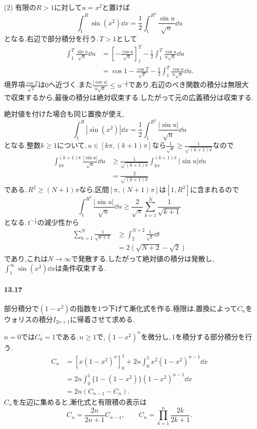 (2) 有限の$R>1$に対して$u=x^2$と置けば
\[
 \int_1^R\sin(x^2)\dd x
 =\frac12\int_1^{R^2}\frac{\sin u}{\sqrt u}\dd u
\]
となる.右辺で部分積分を行う.\,$T>1$として
\[
 \begin{aligned}
 \int_1^T\frac{\sin u}{\sqrt u}\dd u
 &=\left[-\frac{\cos u}{\sqrt u}\right]_1^T
   -\frac12\int_1^T\frac{\cos u}{u\sqrt u}\dd u\\
 &=\cos1-\frac{\cos T}{\sqrt T}
   -\frac12\int_1^T\frac{\cos u}{u\sqrt u}\dd u.
 \end{aligned}
\]
境界項$\frac{\cos T}{\sqrt T}$は$0$へ近づく.また$\frac{|\cos u|}{u\sqrt u}\le u^{-\frac32}$であり,右辺のべき関数の積分は無限大で収束するから,最後の積分は絶対収束する.したがって元の広義積分は収束する.

絶対値を付けた場合も同じ置換が使え,
\[
 \int_1^R|\sin(x^2)|\dd x
 =\frac12\int_1^{R^2}\frac{|\sin u|}{\sqrt u}\dd u
\]
となる.整数$k\ge1$について,\,$u\in[k\pi,(k+1)\pi]$なら$\frac1{\sqrt u}\ge\frac1{\sqrt{(k+1)\pi}}$なので
\[
 \begin{aligned}
 \int_{k\pi}^{(k+1)\pi}\frac{|\sin u|}{\sqrt u}\dd u
 &\ge\frac1{\sqrt{(k+1)\pi}}
       \int_{k\pi}^{(k+1)\pi}|\sin u|\dd u\\
 &=\frac2{\sqrt{(k+1)\pi}}
 \end{aligned}
\]
である.\,$R^2\ge(N+1)\pi$なら,区間$[\pi,(N+1)\pi]$は$[1,R^2]$に含まれるので
\[
 \int_1^{R^2}\frac{|\sin u|}{\sqrt u}\dd u
 \ge\frac2{\sqrt\pi}\sum_{k=1}^N\frac1{\sqrt{k+1}}
\]
となる.\,$t^{-\frac12}$の減少性から
\[
 \begin{aligned}
 \sum_{k=1}^N\frac1{\sqrt{k+1}}
 &\ge\int_2^{N+2}\frac1{\sqrt t}\dd t\\
 &=2(\sqrt{N+2}-\sqrt2)
 \end{aligned}
\]
であり,これは$N\to\infty$で発散する.したがって絶対値の積分は発散し,\,$\int_1^{\infty}\sin(x^2)\dd x$は条件収束する.

\paragraph{13.17}
部分積分で$(1-x^2)$の指数を1つ下げて漸化式を作る.極限は,置換によって$C_n$をウォリスの積分$I_{2n+1}$に帰着させて求める.

$n=0$では$C_0=1$である.\,$n\ge1$で,\,$(1-x^2)^n$を微分し,\,$1$を積分する部分積分を行う.
\[
 \begin{aligned}
 C_n
 &=\left[x(1-x^2)^n\right]_0^1
   +2n\int_0^1x^2(1-x^2)^{n-1}\dd x\\
 &=2n\int_0^1\{1-(1-x^2)\}(1-x^2)^{n-1}\dd x\\
 &=2n(C_{n-1}-C_n).
 \end{aligned}
\]
$C_n$を左辺に集めると,漸化式と有限積の表示は
\[
 \boxed{C_n=\frac{2n}{2n+1}C_{n-1},\qquad
 C_n=\prod_{k=1}^n\frac{2k}{2k+1}}.
\]

